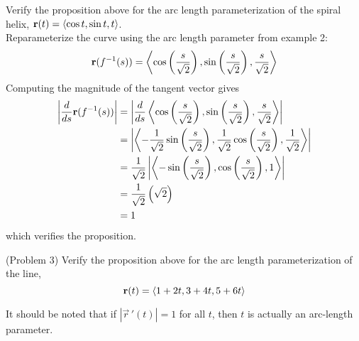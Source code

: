 \documentclass[handout]{ximera}
\begin{document}
\begin{example}[Example 3]
Verify the proposition above for the arc length parameterization of the spiral helix, $\mathbf r(t) = \left\langle \cos t, \sin t, t\right\rangle$.\\ 
Reparameterize the curve using the arc length parameter from example 2:
\[
\mathbf r(f^{-1}(s)) = \left\langle \cos \left(\frac{s}{\sqrt 2}\right), \sin \left(\frac{s}{\sqrt 2}\right),\frac{s}{\sqrt 2}\right\rangle
\]
Computing the magnitude of the tangent vector gives
\begin{align*}
\left| \frac{d}{ds} \mathbf r(f^{-1}(s))\right| &=\left| \frac{d}{ds} \left\langle \cos \left(\frac{s}{\sqrt 2}\right), \sin \left(\frac{s}{\sqrt 2}\right),\frac{s}{\sqrt 2}\right\rangle\right|\\
&= \left| \left\langle  -\frac{1}{\sqrt 2} \sin\left(\frac{s}{\sqrt 2}\right), \frac{1}{\sqrt 2} \cos\left(\frac{s}{\sqrt 2}\right), \frac{1}{\sqrt 2}\right\rangle\right|\\
&= \frac{1}{\sqrt 2} \left|\left\langle -\sin\left(\frac{s}{\sqrt 2}\right),\cos\left(\frac{s}{\sqrt 2}\right),1\right\rangle \right|\\
&= \frac{1}{\sqrt 2} \left(\sqrt 2\right) \\
&= 1
\end{align*}
which verifies the proposition.
\end{example}

\begin{problem}(Problem 3)
Verify the proposition above for the arc length parameterization of the line, 
\[
\mathbf r(t) = \left\langle 1 + 2t, 3+4t, 5+6t\right\rangle
\]
\end{problem}




\begin{remark}
It should be noted that if $|\vec r\,'(t)| = 1$ for all $t$, then $t$ is actually an arc-length parameter.
\end{remark}
\end{document}
